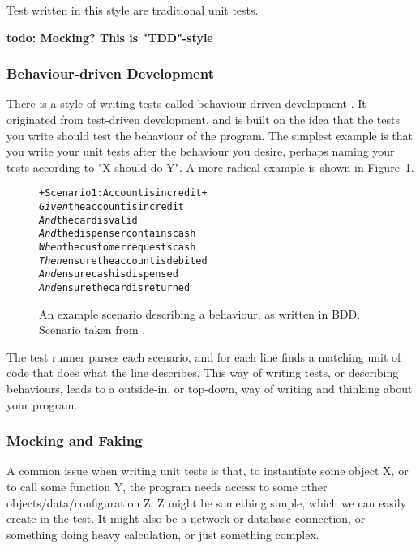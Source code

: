 \documentclass[a4paper,11pt]{kth-mag}
\newcommand{\todo}[1]{\textbf{todo: #1}}
\begin{document}
Test written in this style are traditional unit tests. 

\todo{Mocking? This is "TDD"-style}

\subsubsection{Behaviour-driven Development}

There is a style of writing tests called behaviour-driven development
\cite{north06bdd}. It originated from test-driven development, and is built on
the idea that the tests you write should test the behaviour of the program. The
simplest example is that you write your unit tests after the behaviour you
desire, perhaps naming your tests according to "X should do Y". A more radical
example is shown in Figure~\ref{figure-bdd}.

\begin{figure}[h!]

\begin{alltt}
+Scenario 1: Account is in credit+
\textit{Given} the account is in credit
\textit{And} the card is valid
\textit{And} the dispenser contains cash
\textit{When} the customer requests cash
\textit{Then} ensure the account is debited
\textit{And} ensure cash is dispensed
\textit{And} ensure the card is returned
\end{alltt}

\caption{An example scenario describing a behaviour, as written in BDD.
Scenario taken from \cite{north06bdd}.}
\label{figure-bdd}
\end{figure}

The test runner parses each scenario, and for each line finds a matching unit
of code that does what the line describes. This way of writing tests, or
describing behaviours, leads to a outside-in, or top-down, way of writing and
thinking about your program.

\subsubsection{Mocking and Faking}

A common issue when writing unit tests is that, to instantiate some object X,
or to call some function Y, the program needs access to some other
objects/data/configuration Z. Z might be something simple, which we can easily
create in the test. It might also be a network or database connection, or
something doing heavy calculation, or just something complex.
\end{document}
